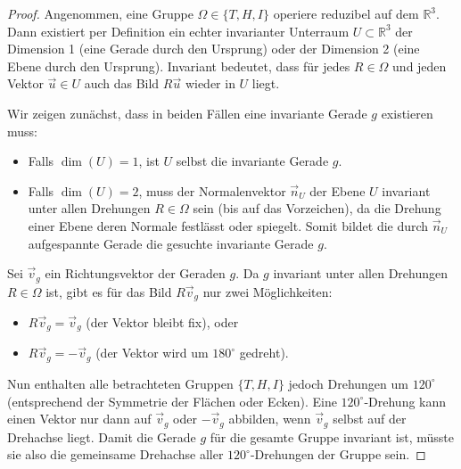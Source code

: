 \begin{proof}
    Angenommen, eine Gruppe $\Omega \in \{T, H, I\}$ operiere reduzibel auf dem $\mathbb{R}^3$. Dann existiert per Definition ein echter invarianter Unterraum $U \subset \mathbb{R}^3$ der Dimension 1 (eine Gerade durch den Ursprung) oder der Dimension 2 (eine Ebene durch den Ursprung). Invariant bedeutet, dass für jedes $R \in \Omega$ und jeden Vektor $\vec{u} \in U$ auch das Bild $R\vec{u}$ wieder in $U$ liegt.

    Wir zeigen zunächst, dass in beiden Fällen eine invariante Gerade $g$ existieren muss:
    \begin{itemize}
        \item Falls $\dim(U) = 1$, ist $U$ selbst die invariante Gerade $g$.
        \item Falls $\dim(U) = 2$, muss der Normalenvektor $\vec{n}_U$ der Ebene $U$ invariant unter allen Drehungen $R \in \Omega$ sein (bis auf das Vorzeichen), da die Drehung einer Ebene deren Normale festlässt oder spiegelt. Somit bildet die durch $\vec{n}_U$ aufgespannte Gerade die gesuchte invariante Gerade $g$.
    \end{itemize}

    Sei $\vec{v}_g$ ein Richtungsvektor der Geraden $g$. Da $g$ invariant unter allen Drehungen $R \in \Omega$ ist, gibt es für das Bild $R\vec{v}_g$ nur zwei Möglichkeiten:
    \begin{itemize}
        \item $R\vec{v}_g = \vec{v}_g$ (der Vektor bleibt fix), oder
        \item $R\vec{v}_g = -\vec{v}_g$ (der Vektor wird um $180^\circ$ gedreht).
    \end{itemize}

    Nun enthalten alle betrachteten Gruppen $\{T, H, I\}$ jedoch Drehungen um $120^\circ$ (entsprechend der Symmetrie der Flächen oder Ecken). Eine $120^\circ$-Drehung kann einen Vektor nur dann auf $\vec{v}_g$ oder $-\vec{v}_g$ abbilden, wenn $\vec{v}_g$ selbst auf der Drehachse liegt. Damit die Gerade $g$ für die gesamte Gruppe invariant ist, müsste sie also die gemeinsame Drehachse aller $120^\circ$-Drehungen der Gruppe sein.


\end{proof}
